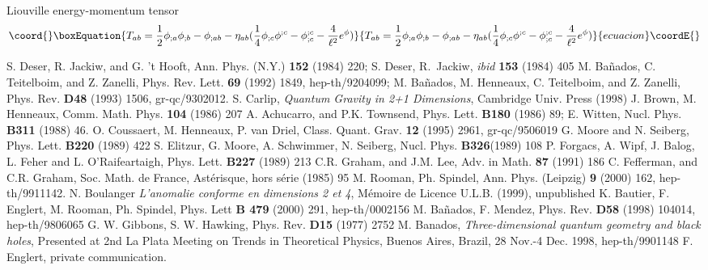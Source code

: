 \documentclass[a4paper,10pt]{article}
\begin{document}
Liouville energy-momentum tensor
\begin{equation}\coord{}\boxEquation{
T_{ab}=  \frac 1 2 \phi _{;a} \phi _{;b} -\phi_{;ab} -\eta_{ab}
(\frac 1 4 \phi_{;c} \phi^{;c} - \phi _{;c}^{;c} - \frac 4 {\ell^2} e^\phi)
}{
T_{ab}=  \frac 1 2 \phi _{;a} \phi _{;b} -\phi_{;ab} -\eta_{ab}
(\frac 1 4 \phi_{;c} \phi^{;c} - \phi _{;c}^{;c} - \frac 4 {\ell^2} e^\phi)
}{ecuacion}\coordE{}\end{equation}

\begin{thebibliography}{999}
 S. Deser, R. Jackiw, and G. 't Hooft, Ann. Phys. (N.Y.) {\bf{152}}
  (1984) 220; S. Deser, R.~Jackiw, {\it ibid} {\bf{153}} (1984) 405
 M. Ba\~nados, C. Teitelboim, and Z. Zanelli, 
  Phys. Rev. Lett. {\bf{69}} (1992) 1849, hep-th/9204099; 
 M. Ba\~nados, M. Henneaux, C. Teitelboim, 
 and Z. Zanelli, Phys. Rev. {\bf{D48}} (1993) 1506, gr-qc/9302012.
 S. Carlip, {\it Quantum Gravity in 2+1 Dimensions}, Cambridge
  Univ. Press (1998)
 J. Brown, M. Henneaux, Comm. Math. Phys. {\bf{104}} (1986) 207
 A. Achucarro, and P.K. Townsend, Phys. Lett. {\bf{B180}} 
 (1986) 89;
  E. Witten, Nucl. Phys. {\bf{B311}} (1988) 46.
 O. Coussaert, M. Henneaux, P. van Driel, Class. Quant. Grav. 
   {\bf{12}} (1995) 2961, gr-qc/9506019
 G. Moore and N. Seiberg, Phys. Lett. {\bf{B220}} (1989) 422
 S. Elitzur, G. Moore, A. Schwimmer, N. Seiberg,
  Nucl. Phys. {\bf{B326}}(1989) 108
 P. Forgacs, A. Wipf, J. Balog, L. Feher and L. O'Raifeartaigh,
Phys. Lett. {\bf{B227}} (1989) 213
 C.R. Graham, and J.M. Lee, Adv. in Math. {\bf{87}} (1991) 186
 C. Fefferman, and C.R. Graham, Soc. Math. de France, 
Ast\'erisque, hors s\'erie (1985) 95
 M. Rooman, Ph. Spindel, Ann. Phys. (Leipzig) {\bf 9} (2000) 162,
hep-th/9911142.
 N. Boulanger {\it L'anomalie conforme en dimensions 2 et 4},
M\'emoire de Licence U.L.B. (1999), unpublished
 K. Bautier, F. Englert, M. Rooman, Ph. Spindel, Phys. Lett {\bf
    B 479} (2000) 291, hep-th/0002156
 M. Ba\~nados, F. Mendez, Phys. Rev. {\bf{D58}} (1998) 104014,
hep-th/9806065
 G. W. Gibbons, S. W. Hawking, Phys. Rev. {\bf{D15}} (1977) 2752
M.  Banados, {\it Three-dimensional quantum geometry and black
holes}, Presented at 2nd La Plata Meeting on Trends in Theoretical
Physics, Buenos Aires, Brazil, 28 Nov.-4 Dec. 1998, hep-th/9901148
 F. Englert, private communication.

\end{thebibliography}
\end{document}
